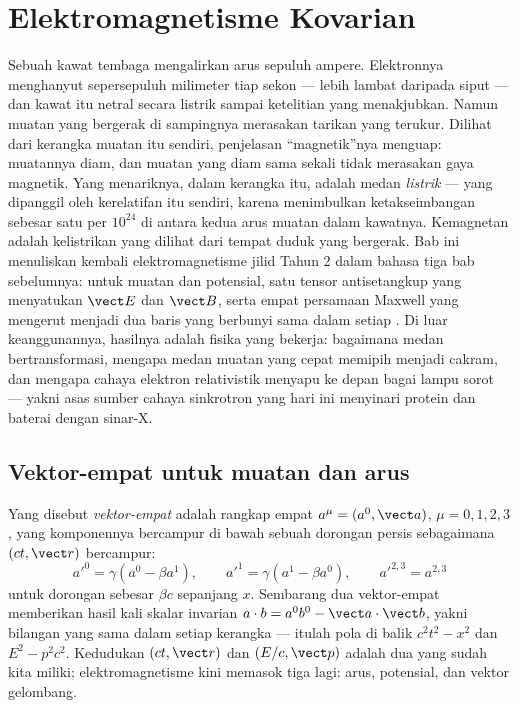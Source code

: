 \chapter{Elektromagnetisme Kovarian}\label{ch:b3:covariant-electromagnetism}

Sebuah kawat tembaga mengalirkan arus sepuluh ampere. Elektronnya
menghanyut sepersepuluh milimeter tiap sekon --- lebih lambat daripada
siput --- dan kawat itu netral secara listrik sampai ketelitian yang
menakjubkan. Namun muatan yang bergerak di sampingnya merasakan tarikan
yang terukur. Dilihat dari kerangka muatan itu sendiri, penjelasan
``magnetik''nya menguap: muatannya diam, dan muatan yang diam sama
sekali tidak merasakan gaya magnetik. Yang menariknya, dalam kerangka
itu, adalah medan \emph{listrik} --- yang dipanggil oleh kerelatifan itu
sendiri, karena  menimbulkan ketakseimbangan sebesar
satu per $10^{24}$ di antara kedua arus muatan dalam kawatnya.
Kemagnetan adalah kelistrikan yang dilihat dari tempat duduk yang
bergerak. Bab ini menuliskan kembali elektromagnetisme jilid Tahun 2
dalam bahasa tiga bab sebelumnya:  untuk muatan dan
potensial, satu tensor antisetangkup yang menyatukan $\vect E$ dan
$\vect B$, serta empat persamaan Maxwell yang mengerut menjadi dua baris
yang berbunyi sama dalam setiap . Di luar keanggunannya,
hasilnya adalah fisika yang bekerja: bagaimana medan bertransformasi,
mengapa medan muatan yang cepat memipih menjadi cakram, dan mengapa
cahaya elektron relativistik menyapu ke depan bagai lampu sorot ---
yakni asas sumber cahaya sinkrotron yang hari ini menyinari protein dan
baterai dengan sinar-X.

\section{Vektor-empat untuk muatan dan arus}

\begin{definition}\label{def:b3:covariant-electromagnetism:fourvector}
Yang disebut \emph{vektor-empat} adalah rangkap empat $a^\mu = (a^0, \vect a)$, $\mu =
0, 1, 2, 3$, yang komponennya bercampur di bawah sebuah dorongan
persis sebagaimana $(ct,
\vect r)$ bercampur:
\[
a'^0 = \gamma(a^0 - \beta a^1) , \qquad
a'^1 = \gamma(a^1 - \beta a^0) , \qquad
a'^{2,3} = a^{2,3}
\]
untuk dorongan sebesar $\beta c$ sepanjang $x$. Sembarang dua
vektor-empat memberikan hasil kali skalar invarian
$a\cdot b = a^0b^0 - \vect a\cdot\vect b$, yakni bilangan yang sama
dalam setiap kerangka --- itulah pola di balik $c^2t^2 - x^2$
dan $E^2 - p^2c^2$. Kedudukan $(ct, \vect r)$ dan 
$(E/c, \vect p)$ adalah dua yang sudah kita miliki; elektromagnetisme
kini memasok tiga lagi: arus, potensial, dan vektor gelombang.
\end{definition}

